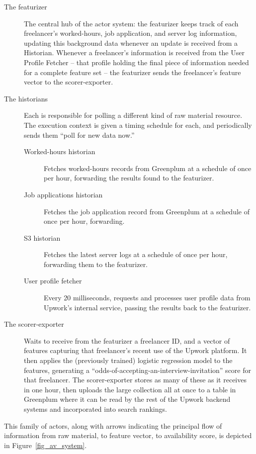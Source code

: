 \documentclass[tablecaption=bottom,wcp]{jmlr}
\begin{document}
\begin{description}
\item[The featurizer] The central hub of the actor system: the featurizer keeps track of
each freelancer's worked-hours, job application, and server log information,
updating this background data whenever an update is received from a Historian.
Whenever a freelancer's information is received from the User Profile Fetcher -- that 
profile holding the final piece of information needed for a complete feature set --
the featurizer sends the freelancer's feature vector to the scorer-exporter.

\item[The historians] Each is responsible for polling a different kind of raw
material resource. The execution context is given a timing schedule for
each, and periodically sends them ``poll for new data now.''
	\begin{description}
	\item[Worked-hours historian] Fetches worked-hours records from 
	Greenplum at a schedule of once per hour, forwarding the results found
	to the featurizer.
	\item[Job applications historian] Fetches the job application record from
	Greenplum at a schedule of once per hour, forwarding.
	\item[S3 historian] Fetches the latest server logs at a schedule of once per hour,
	forwarding them to the featurizer.
	\item[User profile fetcher] Every 20 milliseconds, requests and processes user 
	profile data from Upwork's internal service, passing the results back to the featurizer.
	\end{description}

\item[The scorer-exporter] Waits to receive from the featurizer  a freelancer ID, and a
vector of features capturing that freelancer's recent use of the Upwork platform.
It then applies the (previously trained) logistic regression model to the features,
generating a ``odds-of-accepting-an-interview-invitation'' score for that freelancer.
The scorer-exporter stores as many of these as it receives in one hour, then
uploads the large collection all at once to a table in Greenplum where it can be
read by the rest of the Upwork backend systems and incorporated into search
rankings.

\end{description}

This family of actors, along with arrows indicating the principal flow of information 
from raw material, to feature vector, to availability score, is depicted in
Figure~\ref{fig_av_system}.
\end{document}

